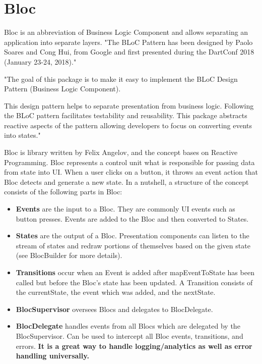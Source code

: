 \section{Bloc}\label{sec:bloc}
Bloc is an abbreviation of Business Logic Component and allows separating an application into separate layers.\cite{bloc}
"The BLoC Pattern has been designed by Paolo Soares and Cong Hui, from Google and first presented during the DartConf 2018 (January 23-24, 2018)."\cite{didierboelens}

"The goal of this package is to make it easy to implement the BLoC Design Pattern (Business Logic Component).

This design pattern helps to separate presentation from business logic.
Following the BLoC pattern facilitates testability and reusability.
This package abstracts reactive aspects of the pattern allowing developers to focus on converting events into states."\cite{bloc}

Bloc is library written by Felix Angelov, and the concept bases on Reactive Programming.\cite{bloc}
Bloc represents a control unit what is responsible for passing data from state into UI.
When a user clicks on a button, it throws an event action that Bloc detects and generate a new state.
In a nutshell, a structure of the concept consists of the following parts in Bloc:
\begin{itemize}
    \item \textbf{Events} are the input to a Bloc.
    They are commonly UI events such as button presses.
    Events are added to the Bloc and then converted to States.
    \item \textbf{States} are the output of a Bloc.
    Presentation components can listen to the stream of states and redraw portions of themselves based on the given state (see BlocBuilder for more details).
    \item \textbf{Transitions} occur when an Event is added after mapEventToState has been called but before the Bloc's state has been updated.
    A Transition consists of the currentState, the event which was added, and the nextState.
    \item \textbf{BlocSupervisor} oversees Blocs and delegates to BlocDelegate.
    \item \textbf{BlocDelegate} handles events from all Blocs which are delegated by the BlocSupervisor.
    Can be used to intercept all Bloc events, transitions, and errors.
    \textbf{It is a great way to handle logging/analytics as well as error handling universally.}\cite{bloc}
\end{itemize}


